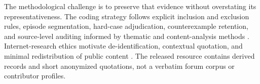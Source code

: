 The methodological challenge is to preserve that evidence without overstating its representativeness. The coding strategy follows explicit inclusion and exclusion rules, episode segmentation, hard-case adjudication, counterexample retention, and source-level auditing informed by thematic and content-analysis methods \cite{braun2006thematic,krippendorff2018content}. Internet-research ethics motivate de-identification, contextual quotation, and minimal redistribution of public content \cite{aoir2019ethics}. The released resource contains derived records and short anonymized quotations, not a verbatim forum corpus or contributor profiles.
